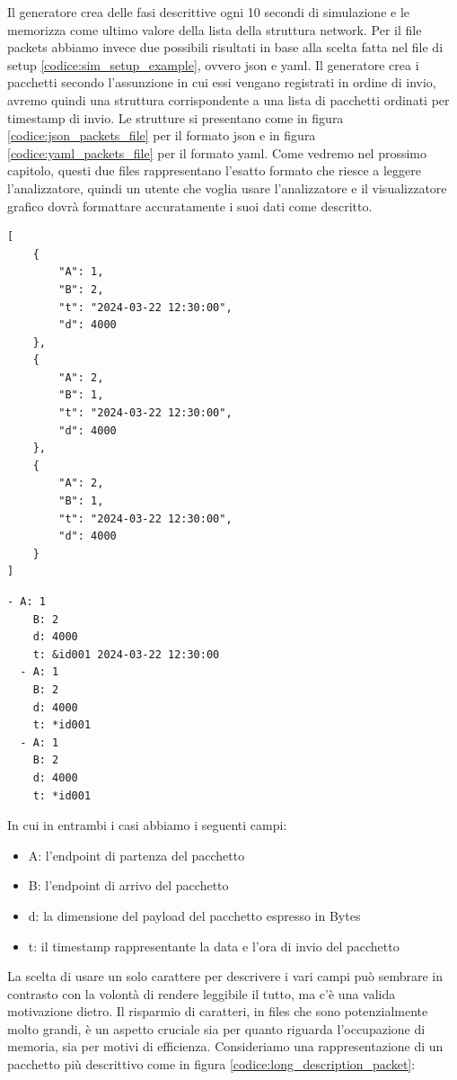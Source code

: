 \documentclass[binding=0.6cm]{sapthesis}
\begin{document}
Il generatore crea delle fasi descrittive ogni 10 secondi di simulazione e le memorizza come ultimo valore della lista della struttura network.
Per il file packets abbiamo invece due possibili risultati in base alla scelta fatta nel file di setup \ref{codice:sim_setup_example}, ovvero json e yaml.
Il generatore crea i pacchetti secondo l'assunzione in cui essi vengano registrati in ordine di invio, avremo quindi una struttura corrispondente
a una lista di pacchetti ordinati per timestamp di invio.
Le strutture si presentano come in figura \ref{codice:json_packets_file} per il formato json e in figura \ref{codice:yaml_packets_file} per il formato yaml.
Come vedremo nel prossimo capitolo, questi due files rappresentano l'esatto formato che riesce a leggere l'analizzatore, quindi un utente
che voglia usare l'analizzatore e il visualizzatore grafico dovrà formattare accuratamente i suoi dati come descritto.

{\scriptsize %
\begin{lstlisting}[caption={esempio di packets file in formato json}, label={codice:json_packets_file}]
[
    {
        "A": 1,
        "B": 2,
        "t": "2024-03-22 12:30:00",
        "d": 4000
    },
    {
        "A": 2,
        "B": 1,
        "t": "2024-03-22 12:30:00",
        "d": 4000
    },
    {
        "A": 2,
        "B": 1,
        "t": "2024-03-22 12:30:00",
        "d": 4000
    }
]
\end{lstlisting}
}

{\scriptsize %
\begin{lstlisting}[caption={esempio di packets file in formato yaml}, label={codice:yaml_packets_file}]
  - A: 1
    B: 2
    d: 4000
    t: &id001 2024-03-22 12:30:00
  - A: 1
    B: 2
    d: 4000
    t: *id001
  - A: 1
    B: 2
    d: 4000
    t: *id001
\end{lstlisting}
}

In cui in entrambi i casi abbiamo i seguenti campi:
\begin{itemize}
    \item A: l'endpoint di partenza del pacchetto
    \item B: l'endpoint di arrivo del pacchetto
    \item d: la dimensione del payload del pacchetto espresso in Bytes
    \item t: il timestamp rappresentante la data e l'ora di invio del pacchetto
\end{itemize}
La scelta di usare un solo carattere per descrivere i vari campi può sembrare in contrasto con la volontà di rendere leggibile il tutto,
ma c'è una valida motivazione dietro. Il risparmio di caratteri, in files che sono potenzialmente molto grandi, è un aspetto cruciale sia per quanto
riguarda l'occupazione di memoria, sia per motivi di efficienza. Consideriamo una rappresentazione di un pacchetto più descrittivo come in figura \ref{codice:long_description_packet}:
\end{document}
